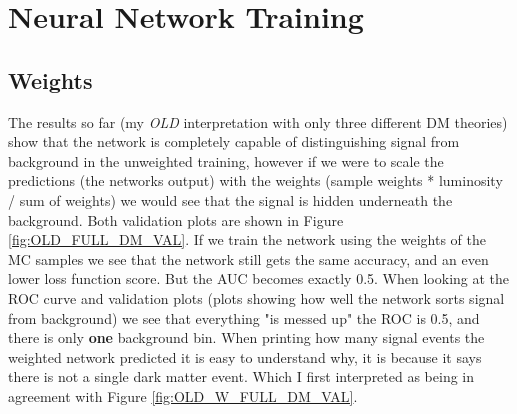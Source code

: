 \documentclass[14pt, a4paper]{book}
\begin{document}
\section{Neural Network Training}
\subsection{Weights}\label{sec:wgts}
The results so far (my \textit{OLD} interpretation with only three different DM theories) show that the network is completely capable of distinguishing signal from background in the unweighted training, however if we were to scale the predictions (the networks output) with the weights (sample weights * luminosity / sum of weights) we would see that the signal is hidden underneath the background. Both validation plots are shown in Figure \ref{fig:OLD_FULL_DM_VAL}. If we train the network using the weights of the MC samples we see that the network still gets the same accuracy, and an even lower loss function score. But the AUC becomes exactly 0.5. When looking at the ROC curve and validation plots (plots showing how well the network sorts signal from background) we see that everything "is messed up" the ROC is 0.5, and there is only \textbf{one} background bin. When printing how many signal events the weighted network predicted it is easy to understand why, it is because it says there is not a single dark matter event. Which I first interpreted as being in agreement with Figure \ref{fig:OLD_W_FULL_DM_VAL}.\\
\end{document}
